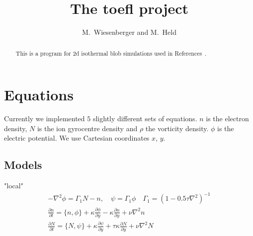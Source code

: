 





\title{The toefl project}
\author{ M.~Wiesenberger and M.~Held}
\maketitle

\begin{abstract}
  This is a program for 2d isothermal blob simulations used in References~\cite{Wiesenberger2014,Kube2016,Wiesenberger2017a}.
\end{abstract}

\section{Equations}
Currently we implemented $5$ slightly different sets of equations. $n$ is the electron density, $N$ is the ion gyrocentre density and $\rho$
the vorticity density. $\phi$ is the electric potential. We
use Cartesian coordinates $x$, $y$.
\subsection{Models}

"local"
\begin{subequations}
\begin{align}
 -\nabla^2 \phi =  \Gamma_1 N -n, \quad
\psi = \Gamma_1 \phi \quad \Gamma_1 = ( 1- 0.5\tau\nabla^2)^{-1} \\
 \frac{\partial n}{\partial t}     = 
    \{ n, \phi\} 
  + \kappa \frac{\partial \phi}{\partial y} 
  -\kappa \frac{\partial n}{\partial y}
  + \nu \nabla^2 n  \\
  \frac{\partial N}{\partial t} =
  \{ N, \psi\} 
  + \kappa \frac{\partial \psi}{\partial y} 
  + \tau \kappa\frac{\partial N}{\partial y} +\nu\nabla^2N
\end{align}
\end{subequations}


